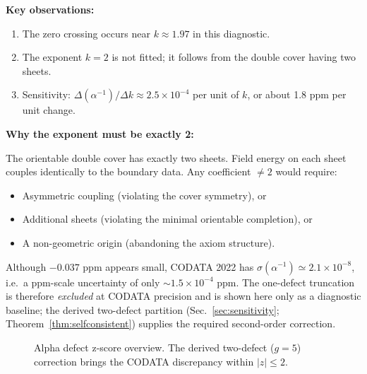 \textbf{Key observations:}
\begin{enumerate}[leftmargin=1.5em, topsep=2pt, itemsep=1pt]
    \item The zero crossing occurs near $k \approx 1.97$ in this diagnostic.
    \item The exponent $k=2$ is not fitted; it follows from the double cover having two sheets.
    \item Sensitivity: $\Delta(\alpha^{-1})/\Delta k \approx 2.5 \times 10^{-4}$ per unit of $k$, 
        or about 1.8 ppm per unit change.
\end{enumerate}

\textbf{Why the exponent must be exactly 2:}

The orientable double cover has exactly two sheets. Field energy on each sheet couples 
identically to the boundary data. Any coefficient $\neq 2$ would require:
\begin{itemize}[leftmargin=1.5em, topsep=2pt, itemsep=1pt]
    \item Asymmetric coupling (violating the cover symmetry), or
    \item Additional sheets (violating the minimal orientable completion), or
    \item A non-geometric origin (abandoning the axiom structure).
\end{itemize}

Although $-0.037$ ppm appears small, CODATA 2022 has $\sigma(\alpha^{-1})\simeq 2.1\times 10^{-8}$, i.e.\ a ppm-scale uncertainty of only $\sim 1.5\times 10^{-4}$ ppm. The one-defect truncation is therefore \emph{excluded} at CODATA precision and is shown here only as a diagnostic baseline; the derived two-defect partition (Sec.~\ref{sec:sensitivity}; Theorem~\ref{thm:selfconsistent}) supplies the required second-order correction.

\TFPTAlphaSensitivityPlot

\begin{figure}[H]
\centering
{}
\caption{Alpha defect z-score overview. The derived two-defect ($g=5$) correction brings the CODATA discrepancy within $|z|\le 2$.}
\label{fig:alpha-defect-z}
\end{figure}

